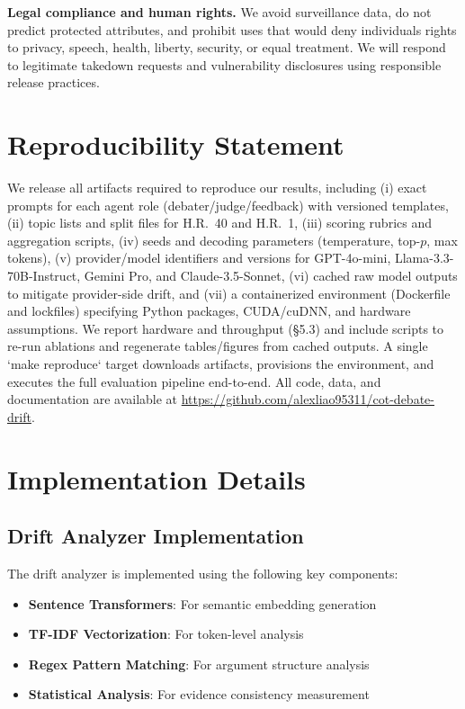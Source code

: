\documentclass[11pt]{article}
\begin{document}
\textbf{Legal compliance and human rights.} We avoid surveillance data, do not predict protected attributes, and prohibit uses that would deny individuals rights to privacy, speech, health, liberty, security, or equal treatment. We will respond to legitimate takedown requests and vulnerability disclosures using responsible release practices.


\section*{Reproducibility Statement}
We release all artifacts required to reproduce our results, including (i) exact prompts for each agent role (debater/judge/feedback) with versioned templates, (ii) topic lists and split files for H.R.~40 and H.R.~1, (iii) scoring rubrics and aggregation scripts, (iv) seeds and decoding parameters (temperature, top-$p$, max tokens), (v) provider/model identifiers and versions for GPT-4o-mini, Llama-3.3-70B-Instruct, Gemini Pro, and Claude-3.5-Sonnet, (vi) cached raw model outputs to mitigate provider-side drift, and (vii) a containerized environment (Dockerfile and lockfiles) specifying Python packages, CUDA/cuDNN, and hardware assumptions. We report hardware and throughput (\S5.3) and include scripts to re-run ablations and regenerate tables/figures from cached outputs. A single `make reproduce` target downloads artifacts, provisions the environment, and executes the full evaluation pipeline end-to-end. All code, data, and documentation are available at \url{https://github.com/alexliao95311/cot-debate-drift}.




\appendix

\section{Implementation Details}

\subsection{Drift Analyzer Implementation}

The drift analyzer is implemented using the following key components:

\begin{itemize}
    \item \textbf{Sentence Transformers}: For semantic embedding generation
    \item \textbf{TF-IDF Vectorization}: For token-level analysis
    \item \textbf{Regex Pattern Matching}: For argument structure analysis
    \item \textbf{Statistical Analysis}: For evidence consistency measurement
\end{itemize}
\end{document}
